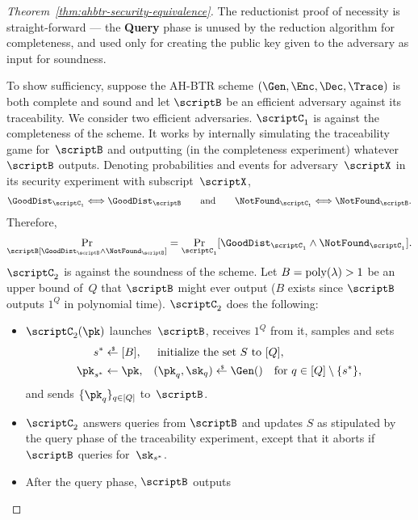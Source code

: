 \begin{proof}
[%
Theorem~\ref{thm:ahbtr-security-equivalence}]
The reductionist proof of necessity is straight-forward ---
the \textbf{Query} phase is
unused by the reduction algorithm for completeness, and
used only for creating the public key given to the adversary as input
for soundness.

To show sufficiency, suppose the AH-BTR scheme $(\Gen,\Enc,\Dec,\Trace)$ is both complete and sound and let $\scriptB$ be an efficient adversary against its traceability.
We consider two efficient adversaries.
$\scriptC_1$ is against the completeness of the scheme.
It works by internally simulating the traceability game for~$\scriptB$ and outputting (in the completeness experiment) whatever $\scriptB$ outputs.
Denoting probabilities and events for adversary~$\scriptX$ in its security experiment with subscript~$\scriptX$,
\begin{align*}
\GoodDist_{\scriptC_1}
\Longleftrightarrow
\GoodDist_\scriptB
\qquad\textup{and}\qquad
\NotFound_{\scriptC_1}
\Longleftrightarrow
\NotFound_\scriptB.
\end{align*}
Therefore,
\begin{align*}
\Pr_\scriptB[\GoodDist_\scriptB\wedge\NotFound_\scriptB]
=
\Pr_{\scriptC_1}
[\GoodDist_{\scriptC_1}\wedge\NotFound_{\scriptC_1}].
\end{align*}
$\scriptC_2$ is against the soundness of the scheme.
Let ${B=\operatorname{poly}(\lambda)>1}$ be an upper bound of~$Q$ that $\scriptB$ might ever output ($B$ exists since $\scriptB$ outputs $1^Q$ in polynomial time).
$\scriptC_2$ does the following:
\begin{itemize}
\item $\scriptC_2(\pk)$ launches~$\scriptB$, receives $1^Q$ from it,
samples and sets
\begin{align*}
s^\ast&{}\draws[B],&&
\textup{ initialize the set }S\textup{ to }[Q],\\
\pk_{s^\ast}&{}\gets\pk,&&
(\pk_q,\sk_q)\draws\Gen()\quad\textup{for }q\in{[Q]\setminus{\{s^\ast\}}},
\end{align*}
and sends $\{\pk_q\}_{q\in[Q]}$ to~$\scriptB$.
\item $\scriptC_2$ answers queries from $\scriptB$ and updates $S$ as stipulated by the query phase of the traceability experiment, except that it aborts if $\scriptB$ queries for~$\sk_{s^\ast}$.
\item After the query phase, $\scriptB$ outputs

\end{itemize}
\end{proof}
